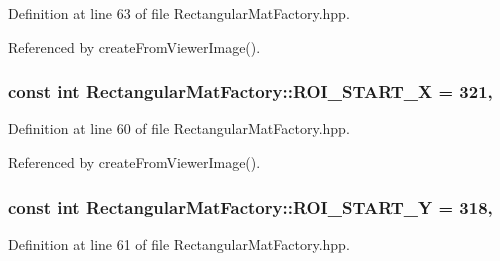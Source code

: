 Definition at line 63 of file Rectangular\-Mat\-Factory.\-hpp.



Referenced by create\-From\-Viewer\-Image().

\hypertarget{classmultiscale_1_1analysis_1_1RectangularMatFactory_a90e622e964218af93ca0d024dc3faa41}{
\subsubsection[{R\-O\-I\-\_\-\-S\-T\-A\-R\-T\-\_\-\-X}]{\setlength{\rightskip}{0pt plus 5cm}const int Rectangular\-Mat\-Factory\-::\-R\-O\-I\-\_\-\-S\-T\-A\-R\-T\-\_\-\-X = 321\hspace{0.3cm}{\ttfamily [static]}, {\ttfamily [private]}}}\label{classmultiscale_1_1analysis_1_1RectangularMatFactory_a90e622e964218af93ca0d024dc3faa41}


Definition at line 60 of file Rectangular\-Mat\-Factory.\-hpp.



Referenced by create\-From\-Viewer\-Image().

\hypertarget{classmultiscale_1_1analysis_1_1RectangularMatFactory_a1a25934dba59fe883d88e9735eb33db6}{
\subsubsection[{R\-O\-I\-\_\-\-S\-T\-A\-R\-T\-\_\-\-Y}]{\setlength{\rightskip}{0pt plus 5cm}const int Rectangular\-Mat\-Factory\-::\-R\-O\-I\-\_\-\-S\-T\-A\-R\-T\-\_\-\-Y = 318\hspace{0.3cm}{\ttfamily [static]}, {\ttfamily [private]}}}\label{classmultiscale_1_1analysis_1_1RectangularMatFactory_a1a25934dba59fe883d88e9735eb33db6}


Definition at line 61 of file Rectangular\-Mat\-Factory.\-hpp.



